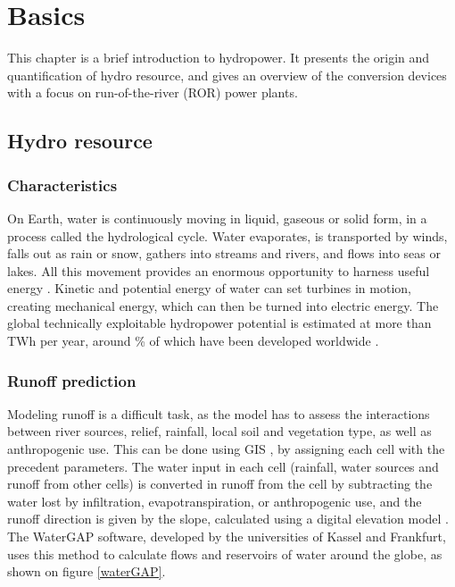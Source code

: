 \chapter{Basics}
\label{chap:basics}

This chapter is a brief introduction to hydropower. It presents the origin and quantification of hydro resource, and gives an overview of the conversion devices with a focus on run-of-the-river (ROR) power plants.

\section{Hydro resource}

\subsection{Characteristics}

On Earth, water is continuously moving in liquid, gaseous or solid form, in a process called the hydrological cycle. Water evaporates, is transported by winds, falls out as rain or snow, gathers into streams and rivers, and flows into seas or lakes. All this movement provides an enormous opportunity to harness useful energy \cite{ucsusa}. Kinetic and potential energy of water can set turbines in motion, creating mechanical energy, which can then be turned into electric energy. The global technically exploitable hydropower potential is estimated at more than \unit[16400]{TWh} per year, around \unit[19]{\%} of which have been developed worldwide \cite{iea_hp_ess}.
 
\subsection{Runoff prediction}
 
Modeling runoff is a difficult task, as the model has to assess the interactions between river sources, relief, rainfall, local soil and vegetation type, as well as anthropogenic use. This can be done using GIS \cite{bayazit}, by assigning each cell with the precedent parameters. The water input in each cell (rainfall, water sources and runoff from other cells) is converted in runoff from the cell by subtracting the water lost by infiltration, evapotranspiration, or anthropogenic use, and the runoff direction is given by the slope, calculated using a digital elevation model \cite{heywood}. \newline
The WaterGAP software, developed by the universities of Kassel and Frankfurt, uses this method to calculate flows and reservoirs of water around the globe, as shown on figure \ref{waterGAP}.

